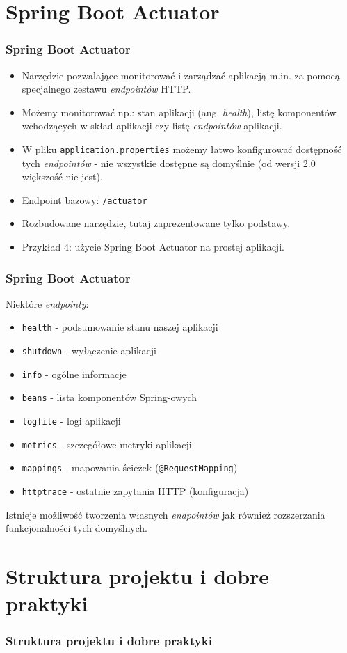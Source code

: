 \documentclass{beamer}
\begin{document}
\section{Spring Boot Actuator}

\begin{frame}
\frametitle{Spring Boot Actuator}
\begin{itemize}
\item Narzędzie pozwalające monitorować i zarządzać aplikacją m.in. za pomocą specjalnego zestawu \textit{endpointów} HTTP.
\item Możemy monitorować np.: stan aplikacji (ang. \textit{health}), listę komponentów wchodzących w skład aplikacji czy listę \textit{endpointów} aplikacji.
\item W pliku \lstinline{application.properties} możemy łatwo konfigurować dostępność tych \textit{endpointów} - nie wszystkie dostępne są domyślnie (od wersji 2.0 większość nie jest).
\item Endpoint bazowy: \lstinline{/actuator}
\item Rozbudowane narzędzie, tutaj zaprezentowane tylko podstawy.
\item Przykład 4: użycie Spring Boot Actuator na prostej aplikacji.
\end{itemize}
\end{frame}

\begin{frame}
\frametitle{Spring Boot Actuator}
Niektóre \textit{endpointy}:
\begin{itemize}
\item \lstinline{health} - podsumowanie stanu naszej aplikacji
\item \lstinline{shutdown} - wyłączenie aplikacji
\item \lstinline{info} - ogólne informacje
\item \lstinline{beans} - lista komponentów Spring-owych
\item \lstinline{logfile} - logi aplikacji
\item \lstinline{metrics} - szczegółowe metryki aplikacji
\item \lstinline{mappings} - mapowania ścieżek (\lstinline{@RequestMapping})
\item \lstinline{httptrace} - ostatnie zapytania HTTP (konfiguracja)
\end{itemize}
Istnieje możliwość tworzenia własnych \textit{endpointów} jak również rozszerzania funkcjonalności tych domyślnych.
\end{frame}

\section{Struktura projektu i dobre praktyki}

\begin{frame}
\frametitle{Struktura projektu i dobre praktyki}
\end{frame}
\end{document}
